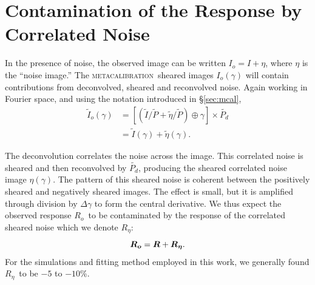 \documentclass[iop, twocolappendix, appendixfloats, numberedappendix, apj]{emulateapj}
\newcommand{\mcal}{\textsc{metacalibration}}
\newcommand{\mcalR}{\mbox{\boldmath $R$}}
\newcommand{\mcalRo}{\mbox{\boldmath $R_o$}}
\newcommand{\mcalRnoise}{\mbox{\boldmath $R_\eta$}}
\newcommand{\Itild}{\mbox{$\widetilde{I}$}}
\newcommand{\ntil}{\mbox{$\widetilde{\eta}$}}
\newcommand{\Ptil}{\mbox{$\widetilde{P}$}}
\newcommand{\Ptild}{\mbox{$\widetilde{P_d}$}}
\newcommand{\SSs}{$\left<R_{S}R_{S}\right>$}
\begin{document}

\section{Contamination of the Response by Correlated Noise} \label{sec:contam}

In the presence of noise, the observed image can be written $I_o=I+\eta$, where $\eta$
is the ``noise image.''  The \mcal\ sheared images $I_o(\gamma)$ will contain
contributions from deconvolved, sheared and reconvolved noise. Again working
in Fourier space, and using the notation introduced in \S \ref{sec:mcal},
\begin{align}
    \Itild_o(\gamma) &= \left[ \left( \Itild/\Ptil + \ntil/\Ptil \right) \oplus \gamma \right] \times \Ptild  \nonumber \\
    &= \Itild(\gamma) + \ntil(\gamma).
\end{align}

The deconvolution correlates the noise across the image.  This correlated
noise is sheared and then reconvolved by \Ptild, producing the
sheared correlated noise image $\eta(\gamma)$.  The pattern of this sheared
noise is coherent between the positively sheared and negatively sheared images.
The effect is small, but it is amplified through division by $\Delta \gamma$ to
form the central derivative.  We thus expect the observed response \mcalRo\ to
be contaminated by the response of the correlated sheared noise which
we denote \mcalRnoise:
\begin{equation}
    \mbox{\mcalRo}  =  \mcalR + \mbox{\mcalRnoise}.
\end{equation}
For the simulations and fitting method employed in this work, we generally
found \mcalRnoise\ to be $-5$ to $-10$\%.
\end{document}
